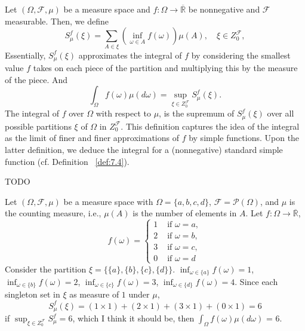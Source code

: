 \begin{definition}
    \label{def:8.3}
    Let $(\Omega, \mathcal{F}, \mu)$ be a measure space and $f:\Omega \to \overline{\mathbb{R}}$ 
    be nonnegative and $\mathcal{F}$ measurable. Then, we define
    \[
    S_\mu^{f}(\xi) = \sum_{A \in \xi} (\inf_{\omega \in A}f(\omega))\mu(A), \quad \xi
    \in Z_0^{\mathcal{F}},
    \] 
    Essentially, $S_\mu^f(\xi)$ approximates the integral of $f$ by considering the smallest 
    value $f$ takes on each piece of the partition and multiplying this by the measure of 
    the piece. And
    \[
    \int_{\Omega} f(\omega)\mu(d\omega) = \sup_{\xi \in Z_0^{\mathcal{F}}} 
    S_\mu^{f}(\xi)
    .\] 
    The integral of $f$ over $\Omega$ with respect to $\mu$, is the supremum of 
    $S_\mu^f(\xi)$ over all possible partitions $\xi$ of $\Omega$ in $Z_0^{\mathcal{F}}$.
    This definition captures the idea of the integral as the limit of finer and finer 
    approximations of $f$ by simple functions.
    Upon the latter definition, we deduce the integral for a (nonnegative) standard simple
    function (cf. Definition ~\ref{def:7.4}).
\end{definition}

\begin{proposition}[]
    \label{prop:8.1}
    TODO
\end{proposition}

\begin{myexample}
    \label{myex:8.1}
    Let $(\Omega, \mathcal{F}, \mu)$ be a measure space with $\Omega = \{a, b, c, d\} $,
    $\mathcal{F} = \mathcal{P}(\Omega)$, and $\mu$ is the counting measure, i.e., $\mu(A)$ is
    the number of elements in $A$. Let $f: \Omega \to \overline{\mathbb{R}}$,
    \[
    f(\omega) = 
    \begin{cases}
        1 & \text{ if } \omega = a,\\
        2 & \text{ if } \omega = b,\\
        3 & \text{ if } \omega = c,\\
        0 & \text{ if } \omega = d
    \end{cases}
    \] 
    Consider the partition $\xi = \{\{a\} , \{b\} , \{c\} , \{d\} \} $. 
    $\inf_{\omega \in \{a\} }f(\omega) = 1$, $\inf_{\omega \in \{b\} }f(\omega) = 2$,
    $\inf_{\omega \in \{c\} }f(\omega) = 3$, $\inf_{\omega \in \{d\} }f(\omega) = 4$.
    Since each singleton set in $\xi$ as measure of $1$ under $\mu$,
    \[
    S_\mu^{f}(\xi) = (1 \times 1) + (2 \times 1) + (3\times 1) + (0\times 1) = 6
    \]
    if $\sup_{\xi \in Z_0^{\mathcal{F}}} S_\mu^{f} = 6$, which I think it should be, then
    $\int_{\Omega} f(\omega)\mu(d\omega)$ = 6.
\end{myexample}

